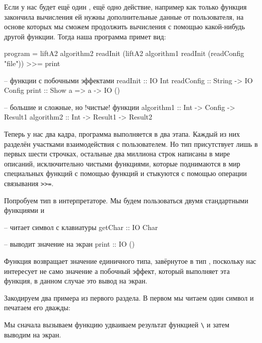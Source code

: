 Если у нас будет ещё один , ещё
одно действие, например как только функция 
 закончила вычисления ей
нужны дополнительные данные от пользователя,
на основе которых мы сможем продолжить вычисления 
с помощью какой-нибудь другой функции. Тогда
наша программа примет вид:

\begin{code}
program = 
    liftA2 algorithm2 readInit 
        (liftA2 algorithm1 readInit (readConfig "file"))
    >>= print

-- функции с побочными эффектами
readInit   :: IO Int
readConfig :: String -> IO Config
print      :: Show a => a -> IO ()

-- большие и сложные, но !чистые! функции
algorithm1  :: Int -> Config -> Result1
algorithm2  :: Int -> Result1 -> Result2
\end{code}

Теперь у нас два кадра, программа выполняется в два этапа.
Каждый из них разделён участками взаимодействия с пользователем.
Но тип  присутствует  лишь в первых шести строчках,
остальные два миллиона строк написаны в мире описаний,
исключительно чистыми функциями, которые поднимаются
в мир специальных функций с помощью функций 
и стыкуются с помощью операции связывания \verb!>>=!.

Попробуем тип  в интерпретаторе. Мы будем
пользоваться двумя стандартными функциями  и 

\begin{code}
-- читает символ с клавиатуры
getChar :: IO Char

-- выводит значение на экран
print :: IO ()
\end{code}

Функция  возвращает значение единичного
типа, завёрнутое в тип , поскольку нас интересует
не само значение а побочный эффект, который выполняет 
эта функция, в данном случае это вывод на экран.

Закодируем два примера из первого раздела. В первом
мы читаем один символ и печатаем его дважды:


Мы сначала вызываем функцию  удваиваем результат
функцией \verb!\! и затем выводим на экран.

